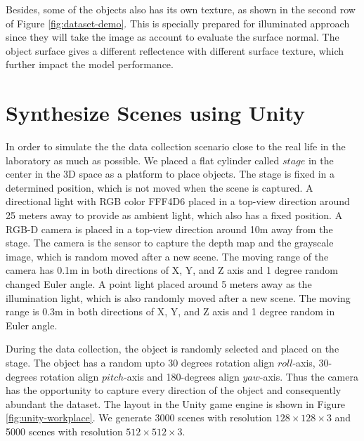 Besides, some of the objects also has its own texture, as shown in the second row of Figure \ref{fig:dataset-demo}. This is specially prepared for illuminated approach since they will take the image as account to evaluate the surface normal. The object surface gives a different reflectence with different surface texture, which further impact the model performance. 

\newcommand{\col}[1]{%
	\textcolor{#1}{\vrule width 0.5cm}}
\section{Synthesize Scenes using Unity}
In order to simulate the the data collection scenario close to the real life in the laboratory as much as possible. We placed a flat cylinder called $ stage $ in the center in the 3D space as a platform to place objects. The stage is fixed in a determined position, which is not moved when the scene is captured. 
A directional light with RGB color FFF4D6 \col{direction-light-color}  placed in a top-view direction around 25 meters away to provide as ambient light, which also has a fixed position.
A RGB-D camera is placed in a top-view direction around 10m away from the stage. The camera is the sensor to capture the depth map and the grayscale image, which is random moved after a new scene. The moving range of the camera has 0.1m in both directions of X, Y, and Z axis and 1 degree random changed Euler angle. 
A point light placed around 5 meters away as the illumination light, which is also randomly moved after a new scene. The moving range is 0.3m in both directions of X, Y, and Z axis and 1 degree random in Euler angle.

During the data collection, the object is randomly selected and placed on the stage. The object has a random upto 30 degrees rotation align $ roll $-axis, 30-degrees rotation align $ pitch $-axis and 180-degrees align $ yaw $-axis. Thus the camera has the opportunity to capture every direction of the object and consequently abundant the dataset. The layout in the Unity game engine is shown in Figure \ref{fig:unity-workplace}. We generate 3000 scenes with resolution $ 128\times128\times3 $ and 5000 scenes with resolution $ 512\times512\times3 $.


